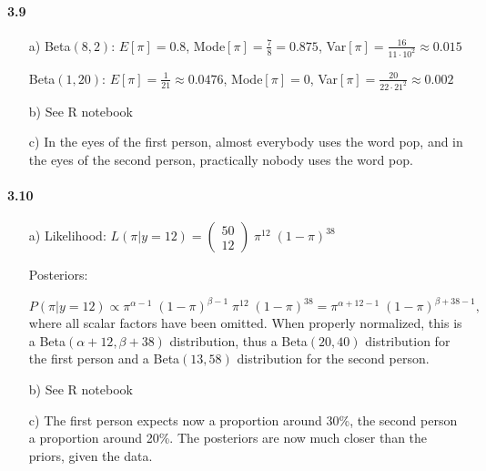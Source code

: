 \documentclass[fontsize=11pt,DIV=18,parskip=half]{scrartcl}
\begin{document}
\paragraph{3.9}
\begin{enumerate}
\item[a)] Beta$(8,2)$: $E[\pi] = 0.8$, Mode$[\pi] = \frac78 = 0.875$, Var$[\pi] = \frac{16}{11\cdot 10^2} \approx 0.015$

Beta$(1,20)$: $E[\pi] = \frac{1}{21} \approx 0.0476$, Mode$[\pi] = 0$, Var$[\pi] = \frac{20}{22 \cdot 21^2} \approx 0.002$

\item[b)] See R notebook
\item[c)] In the eyes of the first person, almost everybody uses the word pop, and in the eyes of the second person, practically nobody uses the word pop.
\end{enumerate}

\paragraph{3.10}
\begin{enumerate}
\item[a)] Likelihood: $L(\pi|y=12) = \begin{pmatrix}50\\12\end{pmatrix} \; \pi^{12} \; (1-\pi)^{38}$

Posteriors: 

\begin{equation*}
P(\pi|y=12) \propto \pi^{\alpha-1} \; (1-\pi)^{\beta-1} \; \pi^{12} \; (1-\pi)^{38} = \pi^{\alpha+12-1} \; (1-\pi)^{\beta+38-1},
\end{equation*}
where all scalar factors have been omitted. When properly normalized, this is a Beta$(\alpha+12, \beta+38)$ distribution, thus a Beta$(20, 40)$ distribution for the first person and a Beta$(13, 58)$ distribution for the second person.

\item[b)] See R notebook
\item[c)] The first person expects now a proportion around 30\%, the second person a proportion around 20\%. The posteriors are now much closer than the priors, given the data.
\end{enumerate}
\end{document}

